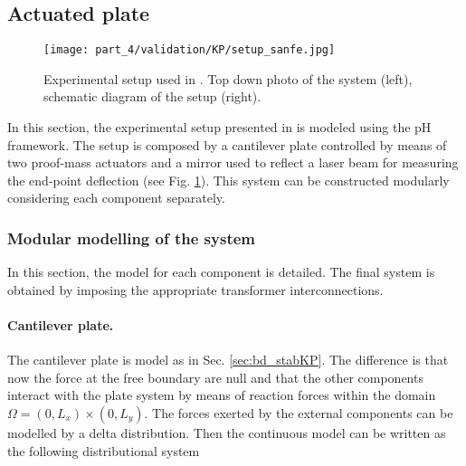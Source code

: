 \subsection{Actuated plate}

\begin{figure}[tb]
	\centering
	\texttt{[image: part\_4/validation/KP/setup\_sanfe.jpg]} 
	\caption{Experimental setup used in \cite{preda2020}. Top down photo of the system (left), schematic diagram of the setup (right).}
	\label{fig:setup_sanfe}
\end{figure}

In this section, the experimental setup presented in \cite{preda2020} is modeled using the pH framework. The setup is composed by a cantilever plate controlled by means of two proof-mass actuators and a mirror used to reflect a laser beam for measuring the end-point deflection (see Fig. \ref{fig:setup_sanfe}).
This system can be constructed modularly considering each component separately. 

\subsubsection{Modular modelling of the system}
In this section, the model for each component is detailed. The final system is obtained by imposing the appropriate transformer interconnections.

\paragraph{Cantilever plate.} The cantilever plate is model as in Sec. \ref{sec:bd_stabKP}. The difference is that now the force at the free boundary are null and that the other components interact with the plate system by means of reaction forces within the domain $\Omega = (0, L_x) \times (0, L_y)$. The forces exerted by the external components can be modelled by a delta distribution. Then the continuous model can be written as the following distributional system

